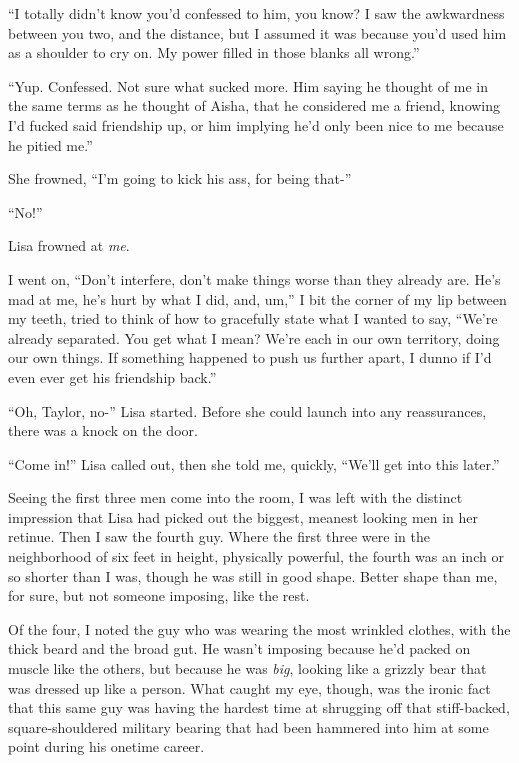 ``I totally didn't know you'd confessed to him, you know?  I saw the awkwardness between you two, and the distance, but I assumed it was because you'd used him as a shoulder to cry on.  My power filled in those blanks all wrong.''



``Yup.  Confessed.  Not sure what sucked more.  Him saying he thought of me in the same terms as he thought of Aisha, that he considered me a friend, knowing I'd fucked said friendship up, or him implying he'd only been nice to me because he pitied me.''



She frowned, ``I'm going to kick his ass, for being that-''



``No!''



Lisa frowned at \emph{me}.



I went on, ``Don't interfere, don't make things worse than they already are.  He's mad at me, he's hurt by what I did, and, um,'' I bit the corner of my lip between my teeth, tried to think of how to gracefully state what I wanted to say, ``We're already separated.  You get what I mean?  We're each in our own territory, doing our own things.  If something happened to push us further apart, I dunno if I'd even ever get his friendship back.''



``Oh, Taylor, no-'' Lisa started.  Before she could launch into any reassurances, there was a knock on the door.



``Come in!'' Lisa called out, then she told me, quickly, ``We'll get into this later.''



Seeing the first three men come into the room, I was left with the distinct impression that Lisa had picked out the biggest, meanest looking men in her retinue.  Then I saw the fourth guy.  Where the first three were in the neighborhood of six feet in height, physically powerful, the fourth was an inch or so shorter than I was, though he was still in good shape.  Better shape than me, for sure, but not someone imposing, like the rest.



Of the four, I noted the guy who was wearing the most wrinkled clothes, with the thick beard and the broad gut.  He wasn't imposing because he'd packed on muscle like the others, but because he was \emph{big}, looking like a grizzly bear that was dressed up like a person.  What caught my eye, though, was the ironic fact that this same guy was having the hardest time at shrugging off that stiff-backed, square-shouldered military bearing that had been hammered into him at some point during his onetime career.



